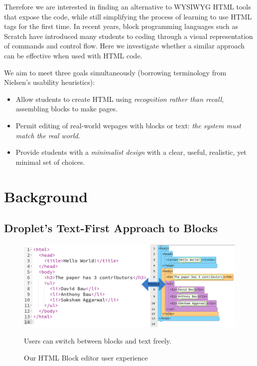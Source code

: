 \documentclass[conference]{IEEEtran}
\begin{document}
Therefore we are interested in finding an alternative to WYSIWYG HTML tools that expose the code, while still simplifying the process of learning to use HTML tags for the first time.  In recent years, block programming languages such as Scratch \cite{Scratch} have introduced many students to coding through a visual representation of commands and control flow.  Here we investigate whether a similar approach can be effective when used with HTML code.

We aim to meet three goals simultaneously (borrowing terminology from Nielsen's usability heuristics\cite{Nielsen}):

\begin{itemize}
\item Allow students to create HTML using \emph{recognition rather than recall}, assembling blocks to make pages.
\item Permit editing of real-world wepages with blocks or text: \emph{the system must match the real world}.
\item Provide students with a \emph{minimalist design} with a clear, useful, realistic, yet minimal set of choices.
\end{itemize}


\section{Background}

\subsection{Droplet's Text-First Approach to Blocks}

\begin{figure}
\centering
\includegraphics[width=\columnwidth]{dualmode.png}
\caption{Our HTML Block editor user experience}
\small
\begin{flushleft}
Users can switch between blocks and text freely.
\end{flushleft}
\label{dropletimage}
\end{figure}
\end{document}
